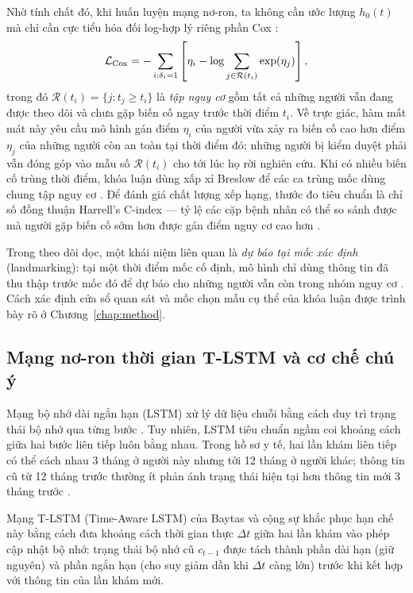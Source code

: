 Nhờ tính chất đó, khi huấn luyện mạng nơ-ron, ta không cần ước lượng $h_0(t)$ mà chỉ cần cực tiểu hóa đối log-hợp lý riêng phần Cox \cite{cox1972regression,katzman2018deepsurv}:
\begin{equation}
 \mathcal L_{\rm Cox}=-\sum_{i:\delta_i=1}\left[\eta_i-\log\sum_{j\in\mathcal R(t_i)}\exp(\eta_j)\right],
 \label{eq:cox-loss}
\end{equation}
trong đó $\mathcal R(t_i)=\{j:t_j\geq t_i\}$ là \emph{tập nguy cơ} gồm tất cả những người vẫn đang được theo dõi và chưa gặp biến cố ngay trước thời điểm $t_i$. Về trực giác, hàm mất mát này yêu cầu mô hình gán điểm $\eta_i$ của người vừa xảy ra biến cố cao hơn điểm $\eta_j$ của những người còn an toàn tại thời điểm đó; những người bị kiểm duyệt phải vẫn đóng góp vào mẫu số $\mathcal R(t_i)$ cho tới lúc họ rời nghiên cứu. Khi có nhiều biến cố trùng thời điểm, khóa luận dùng xấp xỉ Breslow để các ca trùng mốc dùng chung tập nguy cơ \cite{breslow1974covariance}. Để đánh giá chất lượng xếp hạng, thước đo tiêu chuẩn là chỉ số đồng thuận Harrell's C-index — tỷ lệ các cặp bệnh nhân có thể so sánh được mà người gặp biến cố sớm hơn được gán điểm nguy cơ cao hơn \cite{harrell1996multivariable}.

Trong theo dõi dọc, một khái niệm liên quan là \emph{dự báo tại mốc xác định} (landmarking): tại một thời điểm mốc cố định, mô hình chỉ dùng thông tin đã thu thập trước mốc đó để dự báo cho những người vẫn còn trong nhóm nguy cơ \cite{vanhouwelingen2007dynamic}. Cách xác định cửa sổ quan sát và mốc chọn mẫu cụ thể của khóa luận được trình bày rõ ở Chương~\ref{chap:method}.

\subsection{Mạng nơ-ron thời gian T-LSTM và cơ chế chú ý}
\label{sec:background-temporal}
Mạng bộ nhớ dài ngắn hạn (LSTM) xử lý dữ liệu chuỗi bằng cách duy trì trạng thái bộ nhớ qua từng bước \cite{hochreiter1997lstm}. Tuy nhiên, LSTM tiêu chuẩn ngầm coi khoảng cách giữa hai bước liên tiếp luôn bằng nhau. Trong hồ sơ y tế, hai lần khám liên tiếp có thể cách nhau 3 tháng ở người này nhưng tới 12 tháng ở người khác; thông tin cũ từ 12 tháng trước thường ít phản ánh trạng thái hiện tại hơn thông tin mới 3 tháng trước \cite{baytas2017patient}.

Mạng T-LSTM (Time-Aware LSTM) của Baytas và cộng sự \cite{baytas2017patient} khắc phục hạn chế này bằng cách đưa khoảng cách thời gian thực $\Delta t$ giữa hai lần khám vào phép cập nhật bộ nhớ: trạng thái bộ nhớ cũ $c_{t-1}$ được tách thành phần dài hạn (giữ nguyên) và phần ngắn hạn (cho suy giảm dần khi $\Delta t$ càng lớn) trước khi kết hợp với thông tin của lần khám mới.

